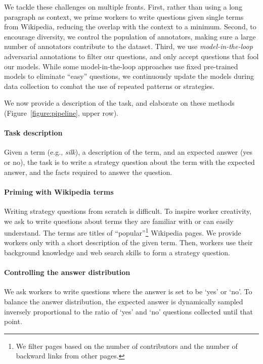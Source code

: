 {We tackle these challenges on multiple fronts. First, rather than using a long paragraph as context,  we prime workers to write questions given single terms from Wikipedia, reducing the overlap with the context to a minimum.
Second, to encourage diversity, we control the population of annotators, making sure a large number of annotators contribute to the dataset. Third, we use \emph{model-in-the-loop} adversarial annotations \cite{dua2019drop,khot2020qasc,bartolo2020beat} to filter our questions, and only accept questions that fool our models. While some model-in-the-loop approaches use fixed pre-trained models to eliminate ``easy'' questions, we continuously update the models during data collection to combat the use of repeated patterns or strategies.

We now provide a description of the task, and elaborate on these methods (Figure~\ref{figure:pipeline}, upper row). 

\paragraph{Task description} Given a term (e.g., \emph{silk}), a description of the term, and an expected answer (yes or no), the task is to write a strategy question about the term with the expected answer, and the facts required to answer the question.

\paragraph{Priming with Wikipedia terms}
Writing strategy questions from scratch is difficult. To inspire worker creativity, we ask to write questions about terms they are familiar with or can easily understand.
The terms are titles of ``popular''\footnote{We filter pages based on the number of contributors and the number of backward links from other pages.} Wikipedia pages.
We provide workers only with a short description of the given term.
Then, workers use their background knowledge and web search skills to form a strategy question.

\paragraph{Controlling the answer distribution} We ask workers to write questions where the answer is set to be `yes' or `no'. To balance the answer distribution, the expected answer is dynamically sampled inversely proportional to the ratio of `yes' and `no' questions collected until that point.

}
